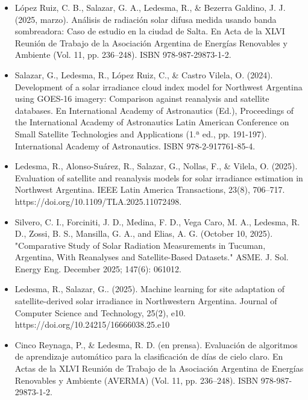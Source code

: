 \begin{itemize}
\item López Ruiz, C. B., Salazar, G. A., Ledesma, R., \& Bezerra Galdino, J. J. (2025, marzo). Análisis de radiación solar difusa medida usando banda sombreadora: Caso de estudio en la ciudad de Salta. En Acta de la XLVI Reunión de Trabajo de la Asociación Argentina de Energías Renovables y Ambiente (Vol. 11, pp. 236–248). ISBN 978-987-29873-1-2.


\item Salazar, G., Ledesma, R., López Ruiz, C., \& Castro Vilela, O. (2024). Development of a solar irradiance cloud index model for Northwest Argentina using GOES-16 imagery: Comparison against reanalysis and satellite databases. En International Academy of Astronautics (Ed.), Proceedings of the International Academy of Astronautics Latin American Conference on Small Satellite Technologies and Applications (1.ª ed., pp. 191-197). International Academy of Astronautics. ISBN 978-2-917761-85-4.

\item Ledesma, R., Alonso-Suárez, R., Salazar, G., Nollas, F., \& Vilela, O. (2025). Evaluation of satellite and reanalysis models for solar irradiance estimation in Northwest Argentina. IEEE Latin America Transactions, 23(8), 706–717. https://doi.org/10.1109/TLA.2025.11072498.

\item Silvero, C. I., Forciniti, J. D., Medina, F. D., Vega Caro, M. A., Ledesma, R. D., Zossi, B. S., Mansilla, G. A., and Elias, A. G. (October 10, 2025). "Comparative Study of Solar Radiation Measurements in Tucuman, Argentina, With Reanalyses and Satellite-Based Datasets." ASME. J. Sol. Energy Eng. December 2025; 147(6): 061012.

\item Ledesma, R., Salazar, G.. (2025). Machine learning for site adaptation of satellite-derived solar irradiance in Northwestern Argentina. Journal of Computer Science and Technology, 25(2), e10. https://doi.org/10.24215/16666038.25.e10
\item Cinco Reynaga, P., \& Ledesma, R. D. (en prensa). Evaluación de algoritmos de aprendizaje automático para la clasificación de días de cielo claro. En Actas de la XLVI Reunión de Trabajo de la Asociación Argentina de Energías Renovables y Ambiente (AVERMA) (Vol. 11, pp. 236–248). ISBN 978-987-29873-1-2.
\end{itemize}






















